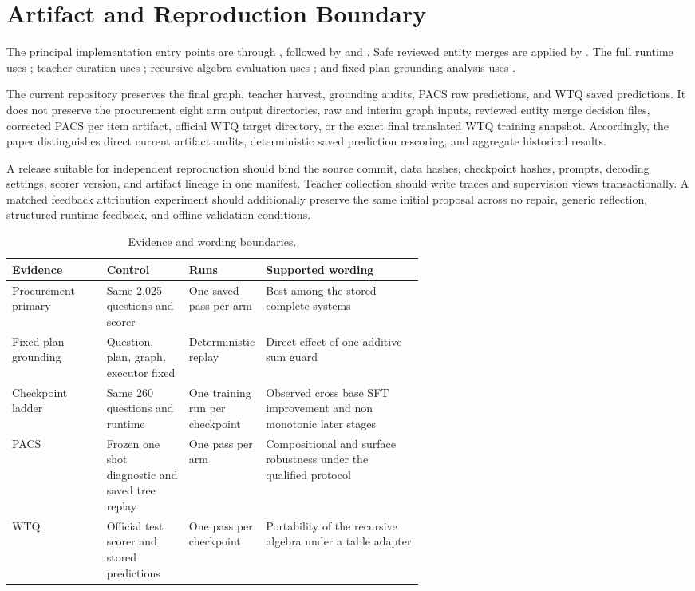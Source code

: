 \documentclass{article}
\begin{document}
\section{Artifact and Reproduction Boundary}
\label{app:artifacts}

The principal implementation entry points are  through
, followed by  and
.  Safe reviewed entity merges are applied by
.  The full runtime uses ; teacher
curation uses ; recursive algebra evaluation uses
; and fixed plan grounding analysis uses
.

The current repository preserves the final graph, teacher harvest, grounding audits, PACS raw
predictions, and WTQ saved predictions.  It does not preserve the procurement eight arm output
directories, raw and interim graph inputs, reviewed entity merge decision files, corrected PACS per
item artifact, official WTQ target directory, or the exact final translated WTQ training snapshot.
Accordingly, the paper distinguishes direct current artifact audits, deterministic saved prediction
rescoring, and aggregate historical results.

A release suitable for independent reproduction should bind the source commit, data hashes,
checkpoint hashes, prompts, decoding settings, scorer version, and artifact lineage in one manifest.
Teacher collection should write traces and supervision views transactionally.  A matched feedback
attribution experiment should additionally preserve the same initial proposal across no repair,
generic reflection, structured runtime feedback, and offline validation conditions.

\begin{table}[h]
  \centering
  \caption{Evidence and wording boundaries.}
  \label{tab:evidence}
  \small
  \begin{tabularx}{\linewidth}{p{0.23\linewidth}p{0.20\linewidth}p{0.17\linewidth}X}
    \toprule
    Evidence & Control & Runs & Supported wording \\
    \midrule
    Procurement primary & Same 2,025 questions and scorer & One saved pass per arm & Best among
    the stored complete systems \\
    Fixed plan grounding & Question, plan, graph, executor fixed & Deterministic replay & Direct
    effect of one additive sum guard \\
    Checkpoint ladder & Same 260 questions and runtime & One training run per checkpoint & Observed
    cross base SFT improvement and non monotonic later stages \\
    PACS & Frozen one shot diagnostic and saved tree replay & One pass per arm & Compositional and
    surface robustness under the qualified protocol \\
    WTQ & Official test scorer and stored predictions & One pass per checkpoint & Portability of
    the recursive algebra under a table adapter \\
    \bottomrule
  \end{tabularx}
\end{table}
\end{document}
